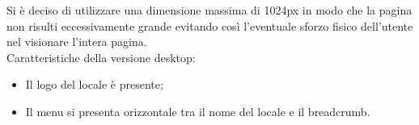 Si è deciso di utilizzare una dimensione massima di 1024px in modo che la pagina non risulti eccessivamente grande evitando così l'eventuale sforzo fisico dell'utente nel visionare l'intera pagina.\\
Caratteristiche della versione desktop:
\begin{itemize}
	\item Il logo del locale è presente;
	\item Il menu si presenta orizzontale tra il nome del locale e il breadcrumb.
\end{itemize}